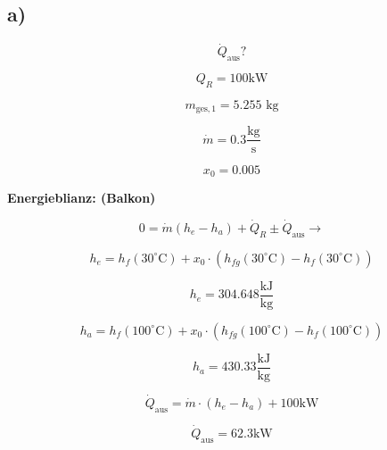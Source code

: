 

\subsection*{a)}

\[
\dot{Q}_{\text{aus}}?
\]

\[
Q_R = 100 \text{kW}
\]

\[
m_{\text{ges},1} = 5.255 \text{ kg}
\]

\[
\dot{m} = 0.3 \frac{\text{kg}}{\text{s}}
\]

\[
x_0 = 0.005
\]

\textbf{Energieblianz: (Balkon)}

\[
0 = \dot{m}(h_e - h_a) + \dot{Q}_R \pm \dot{Q}_{\text{aus}} \rightarrow
\]

\[
h_e = h_f(30^\circ \text{C}) + x_0 \cdot (h_{fg}(30^\circ \text{C}) - h_f(30^\circ \text{C}))
\]

\[
h_e = 304.648 \frac{\text{kJ}}{\text{kg}}
\]

\[
h_a = h_f(100^\circ \text{C}) + x_0 \cdot (h_{fg}(100^\circ \text{C}) - h_f(100^\circ \text{C}))
\]

\[
h_a = 430.33 \frac{\text{kJ}}{\text{kg}}
\]

\[
\dot{Q}_{\text{aus}} = \dot{m} \cdot (h_e - h_a) + 100 \text{kW}
\]

\[
\dot{Q}_{\text{aus}} = 62.3 \text{kW}
\]
